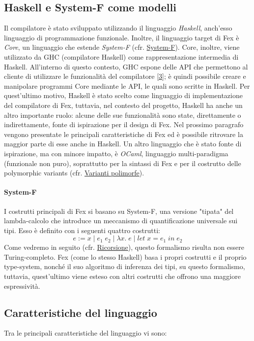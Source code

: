 \documentclass[10pt,a4paper]{article}
\begin{document}
\subsection{Haskell e System-F come modelli}
Il compilatore è stato sviluppato utilizzando il linguaggio \textit{Haskell}, anch'esso linguaggio di programmazione
funzionale.
Inoltre, il linguaggio target di Fex è \textit{Core}, un linguaggio che estende \textit{System-F}
(cfr. \hyperlink{System-F}{System-F}). Core, inoltre,
viene utilizzato da GHC (compilatore Haskell) come rappresentazione intermedia di Haskell. All'interno di questo
contesto, GHC espone delle API che permettono al cliente di utilizzare le funzionalità del compilatore
\hyperlink{bibl3}{[3]}; è quindi
possibile creare e manipolare programmi Core mediante le API, le quali sono scritte in Haskell. Per quest'ultimo
motivo, Haskell è stato scelto come linguaggio di implementazione del compilatore di Fex, tuttavia, nel contesto
del progetto, Haskell ha anche un altro importante ruolo: alcune delle sue funzionalità sono state, direttamente
o indirettamente, fonte di ispirazione per il design di Fex. Nel prossimo paragrafo vengono presentate le principali
caratteristiche di Fex ed è possibile ritrovare la maggior parte di esse anche in Haskell. Un altro linguaggio
che è stato fonte di ispirazione, ma con minore impatto, è \textit{OCaml}, linguaggio multi-paradigma (funzionale non
puro), soprattutto per la sintassi di Fex e per il costrutto delle polymorphic variants (cfr.
\hyperlink{Varianti polimorfe}{Varianti polimorfe}).

\hypertarget{System-F}{\paragraph{System-F}}
I costrutti principali di Fex si basano su System-F, una versione "tipata" del lambda-calcolo che introduce un meccanismo
di quantificazione universale sui tipi. Esso è definito con i seguenti quattro costrutti:
\[ e := x \; | \; e_1 \; e_2 \; | \; \lambda x. \; e \; | \; let \; x = e_1 \; in \; e_2 \]
Come vedremo in seguito (cfr. \hyperlink{Ricorsione}{Ricorsione}), questo formalismo risulta non essere Turing-completo.
Fex (come lo stesso
Haskell) basa i propri costrutti e il proprio type-system, nonché il suo algoritmo di inferenza dei tipi, su questo
formalismo, tuttavia, quest'ultimo viene esteso con altri costrutti che offrono una maggiore espressività.

\hypertarget{Caratteristiche del linguaggio}{\subsection{Caratteristiche del linguaggio}}
Tra le principali caratteristiche del linguaggio vi sono:
\end{document}
